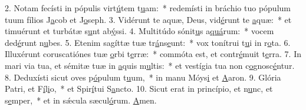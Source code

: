 2. Notam fecísti in pópulis virt\uline{ú}tem t\uline{u}am:~* redemísti in bráchio tuo pópulum tuum fílios J\uline{a}cob et J\uline{o}seph.
3. Vidérunt te aquæ, Deus, vid\uline{é}runt te \uline{a}quæ:~* et timuérunt et turbátæ s\uline{u}nt ab\uline{ý}ssi.
4. Multitúdo sónit\uline{u}s a\uline{quá}rum:~* vocem ded\uline{é}runt n\uline{u}bes.
5. Etenim sagíttæ tuæ tr\uline{á}ns\uline{e}unt:~* vox tonítrui t\uline{u}i in r\uline{o}ta.
6. Illuxérunt coruscatiónes tuæ \uline{o}rbi t\uline{e}rræ:~* commóta est, et contr\uline{é}muit t\uline{e}rra.
7. In mari via tua, et sémitæ tuæ in \uline{a}quis m\uline{u}ltis:~* et vestígia tua non c\uline{o}gnosc\uline{é}ntur.
8. Deduxísti sicut oves p\uline{ó}pulum t\uline{u}um,~* in manu Móys\uline{i} et \uline{A}aron.
9. Glória Patri, et F\uline{í}l\uline{i}o,~* et Spir\uline{í}tui S\uline{a}ncto.
10. Sicut erat in princípio, et n\uline{u}nc, et s\uline{e}mper,~* et in sǽcula sæcul\uline{ó}rum. \uline{A}men.
